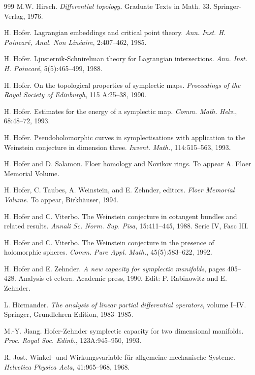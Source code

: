 \begin{thebibliography}{999}
 M.W. Hirsch. \emph{Differential topology.} Graduate Texts
in Math. 33. Springer-Verlag, 1976.

 H. Hofer. Lagrangian embeddings and critical point theory.
\emph{Ann. Inst. H. Poincaré, Anal. Non Linéaire}, 2:407--462, 1985.

 H. Hofer. Ljusternik-Schnirelman theory for Lagrangian
intersections. \emph{Ann. Inst. H. Poincaré}, 5(5):465--499, 1988.

 H. Hofer. On the topological properties of symplectic maps.
\emph{Proceedings of the Royal Society of Edinburgh}, 115 A:25--38, 1990.

 H. Hofer. Estimates for the energy of a symplectic map.
\emph{Comm. Math. Helv.}, 68:48--72, 1993.

 H. Hofer. Pseudoholomorphic curves in symplectisations
with application to the Weinstein conjecture in dimension three.
\emph{Invent. Math.}, 114:515--563, 1993.

 H. Hofer and D. Salamon. Floer homology and Novikov rings.
To appear A. Floer Memorial Volume.

 H. Hofer, C. Taubes, A. Weinstein, and E. Zehnder, editors.
\emph{Floer Memorial Volume.} To appear, Birkhäuser, 1994.

 H. Hofer and C. Viterbo. The Weinstein conjecture in
cotangent bundles and related results. \emph{Annali Sc. Norm. Sup. Pisa},
15:411--445, 1988. Serie IV, Fasc III.

 H. Hofer and C. Viterbo. The Weinstein conjecture in the
presence of holomorphic spheres. \emph{Comm. Pure Appl. Math.},
45(5):583--622, 1992.

 H. Hofer and E. Zehnder. \emph{A new capacity for symplectic
manifolds}, pages 405--428. Analysis et cetera. Academic press, 1990.
Edit: P. Rabinowitz and E. Zehnder.

 L. Hörmander. \emph{The analysis of linear partial
differential operators}, volume I--IV. Springer, Grundlehren Edition,
1983--1985.

 M.-Y. Jiang. Hofer-Zehnder symplectic capacity for two
dimensional manifolds. \emph{Proc. Royal Soc. Edinb.}, 123A:945--950, 1993.

 R. Jost. Winkel- und Wirkungsvariable für allgemeine
mechanische Systeme. \emph{Helvetica Physica Acta}, 41:965--968, 1968.


\end{thebibliography}
